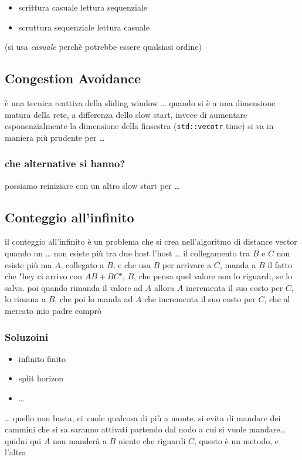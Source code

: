 \documentclass[11pt]{article}
\begin{document}
\begin{itemize}
\item scrittura casuale lettura sequenziale
\item scruttura sequenziale lettura casuale
\end{itemize}

(si usa \emph{casuale} perchè potrebbe essere qualsiasi ordine)

\subsection{Congestion Avoidance}
\label{sec:orgcc04856}
è una tecnica reattiva della sliding window
\ldots{} quando si è a una dimensione matura della rete, a differenza dello slow start, invece di aumentare esponenzialmente la dimensione della finsestra (\texttt{std::vecotr} time)
si va in maniera più prudente per \ldots{}

\subsubsection{che alternative si hanno?}
\label{sec:orge03f18a}
possiamo reiniziare con un altro slow start per \ldots{}

\subsection{Conteggio all'infinito}
\label{sec:org08fe3d6}
il conteggio all'infinito è un problema che si crea nell'algoritmo di distance vector quando un \ldots{} non esiste più tra due host
l'host \ldots{}
il collegamento tra \(B\) e \(C\) non esiste più
ma \(A\), collegato a \(B\), e che usa \(B\) per arrivare a \(C\), manda a \(B\) il fatto che "hey ci arrivo con \(AB + BC\)", \(B\), che pensa quel valore non lo riguardi, se lo salva.
poi quando rimanda il valore ad \(A\) allora \(A\) incrementa il suo costo per \(C\), lo rimana a \(B\), che poi lo manda ad \(A\) che incrementa il suo costo per \(C\), che al mercato mio padre comprò

\subsubsection{Soluzoini}
\label{sec:org4ce9194}
\begin{itemize}
\item infinito finito
\item split horizon
\item \ldots{}
\end{itemize}
\ldots{}
quello non basta, ci vuole qualcosa di più a monte.
si evita di mandare dei cammini che si sa saranno attivati partendo dal nodo a cui si vuole mandare\ldots{}
quidni qui \(A\) non manderà a \(B\) niente che riguardi \(C\), questo è un metodo, e l'altra
\end{document}
